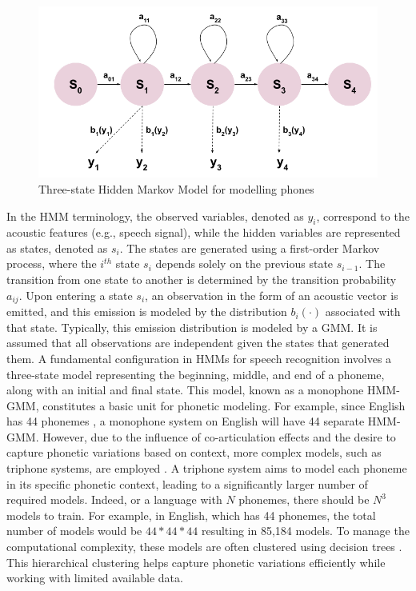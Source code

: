 \begin{figure}
    \begin{center}
    \includegraphics[scale=0.3]{imgs/HMM_monophone.png}
    \caption{Three-state Hidden Markov Model for modelling phones}
    \label{HMM_monophone}    
    \end{center}
\end{figure}
In the \ac{HMM} terminology, the observed variables, denoted as $y_i$, correspond to the acoustic features (e.g., speech signal), while the hidden variables are represented as states, denoted as $s_i$. The states are generated using a first-order Markov process, where the $i^{th}$ state $s_i$ depends solely on the previous state $s_{i-1}$. The transition from one state to another is determined by the transition probability $a_{ij}$. Upon entering a state $s_i$, an observation in the form of an acoustic vector is emitted, and this emission is modeled by the distribution $b_i(\cdot)$ associated with that state. Typically, this emission distribution is modeled by a \ac{GMM}. It is assumed that all observations are independent given the states that generated them. A fundamental configuration in \acp{HMM} for speech recognition involves a three-state model representing the beginning, middle, and end of a phoneme, along with an initial and final state. This model, known as a monophone \ac{HMM-GMM}, constitutes a basic unit for phonetic modeling. For example, since English has 44 phonemes \cite{bizzocchi2017many}, a monophone system on English will have 44 separate \ac{HMM-GMM}. However, due to the influence of co-articulation effects and the desire to capture phonetic variations based on context, more complex models, such as triphone systems, are employed \cite{schwartz1985context}. A triphone system aims to model each phoneme in its specific phonetic context, leading to a significantly larger number of required models.  Indeed, or a language with $N$ phonemes, there should be $N^3$ models to train. For example, in English, which has 44 phonemes, the total number of models would be  $44 * 44 * 44$ resulting in 85,184 models. To manage the computational complexity, these models are often clustered using decision trees \cite{bahl1991context}. This hierarchical clustering helps capture phonetic variations efficiently while working with limited available data.

